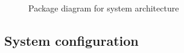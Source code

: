 \documentclass{article}
\begin{document}
\begin{figure}[h]
\centering
{}
\caption{Package diagram for system architecture}
\end{figure}

\subsection{System configuration}
\end{document}
